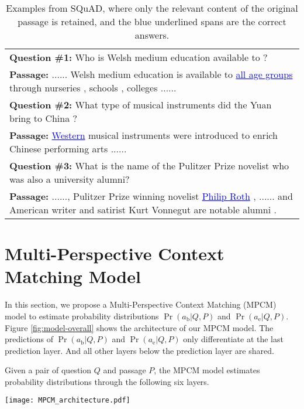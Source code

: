\documentclass[11pt,letterpaper]{article}
\begin{document}
\begin{table}[t]
\setlength{\tabcolsep}{0pt}
\centering
\small
\begin{tabular}{p{}}  
\toprule
\textbf{Question \#1:} Who is Welsh medium education available to ? \\
\textbf{Passage:} ...... Welsh medium education is available to \textcolor{blue}{\underline{all age groups}} through nurseries , schools , colleges ......\\
\midrule
\textbf{Question \#2:} What type of musical instruments did the Yuan bring to China ? \\
\textbf{Passage:}  \textcolor{blue}{\underline{Western}} musical instruments were introduced to enrich Chinese performing arts ...... \\
\midrule
\textbf{Question \#3:} What is the name of the Pulitzer Prize novelist who was also a university alumni? \\
\textbf{Passage:} ......, Pulitzer Prize winning novelist  \textcolor{blue}{\underline{Philip Roth}} , ...... and American writer and satirist Kurt Vonnegut are notable alumni . \\
\bottomrule
\end{tabular}
\caption{Examples from SQuAD, where only the relevant content of the original passage is retained, and the blue underlined spans are the correct answers.}
\label{tab:example}
\end{table}


\section{Multi-Perspective Context Matching Model}
\label{sec:model}
In this section, we propose a Multi-Perspective Context Matching (MPCM) model to 
estimate probability distributions $\Pr(a_{\text{b}}|Q, P)$ and $\Pr(a_{\text{e}}|Q, P)$. 
Figure \ref{fig:model-overall} shows the architecture of our MPCM model. 
The predictions of $\Pr(a_{\text{b}}|Q, P)$ and $\Pr(a_{\text{e}}|Q, P)$ only differentiate at the last prediction layer.
And all other layers below the prediction layer are shared.

Given a pair of question $Q$ and passage $P$, the MPCM model estimates probability distributions through the following six layers.

\begin{figure*}[tbp]
\begin{center}
\texttt{[image: MPCM\_architecture.pdf]}
\end{center}
\caption{Architecture for Multi-Perspective Context Matching Model.}
\label{fig:model-overall}
\end{figure*}
\end{document}
